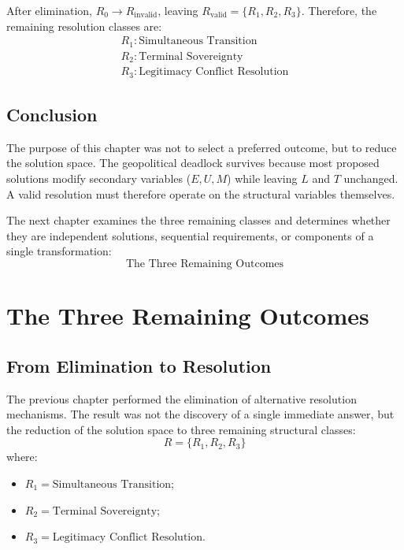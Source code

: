 \documentclass[11pt,openany]{book}
\theoremstyle{plain}
\theoremstyle{definition}
\begin{document}
After elimination, \(R_0 \to R_{\text{invalid}}\), leaving \(R_{\text{valid}} = \{R_1, R_2, R_3\}\). Therefore, the remaining resolution classes are:
\[
\begin{gathered}
\boxed{R_1: \text{Simultaneous Transition}} \\[6pt]
\boxed{R_2: \text{Terminal Sovereignty}} \\[6pt]
\boxed{R_3: \text{Legitimacy Conflict Resolution}}
\end{gathered}
\]

\section*{Conclusion}

The purpose of this chapter was not to select a preferred outcome, but to reduce the solution space. The geopolitical deadlock survives because most proposed solutions modify secondary variables (\(E, U, M\)) while leaving \(L\) and \(T\) unchanged. A valid resolution must therefore operate on the structural variables themselves.

The next chapter examines the three remaining classes and determines whether they are independent solutions, sequential requirements, or components of a single transformation:
\[
\boxed{
\text{The Three Remaining Outcomes}
}
\]

\chapter{The Three Remaining Outcomes}

\section*{From Elimination to Resolution}

The previous chapter performed the elimination of alternative resolution mechanisms. The result was not the discovery of a single immediate answer, but the reduction of the solution space to three remaining structural classes:
\[
R = \{R_1, R_2, R_3\}
\]
where:
\begin{itemize}
\item \(R_1 = \text{Simultaneous Transition}\);
\item \(R_2 = \text{Terminal Sovereignty}\);
\item \(R_3 = \text{Legitimacy Conflict Resolution}\).
\end{itemize}
\end{document}
